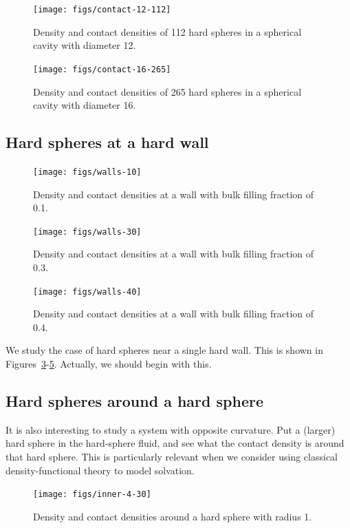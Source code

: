 \documentclass[letterpaper,twocolumn,amsmath,amssymb,prb]{revtex4-1}
\begin{document}
\begin{figure}
  \texttt{[image: figs/contact-12-112]}
  \caption{Density and contact densities of 112 hard spheres in a
    spherical cavity with diameter 12.  \sphereExplanation}
  \label{fig:sphere-12}
\end{figure}

\begin{figure}
  \texttt{[image: figs/contact-16-265]}
  \caption{Density and contact densities of 265 hard spheres in a
    spherical cavity with diameter 16. \sphereExplanation}
  \label{fig:sphere-16}
\end{figure}

\subsection{Hard spheres at a hard wall}

\begin{figure}
  \texttt{[image: figs/walls-10]}
  \caption{Density and contact densities at a wall with bulk filling
    fraction of 0.1.}
  \label{fig:walls-10}
\end{figure}

\begin{figure}
  \texttt{[image: figs/walls-30]}
  \caption{Density and contact densities at a wall with bulk filling
    fraction of 0.3.}
  \label{fig:walls-30}
\end{figure}

\begin{figure}
  \texttt{[image: figs/walls-40]}
  \caption{Density and contact densities at a wall with bulk filling
    fraction of 0.4.}
  \label{fig:walls-40}
\end{figure}

We study the case of hard spheres near a single hard wall.  This is
shown in Figures~\ref{fig:walls-10}-\ref{fig:walls-40}.  Actually, we
should begin with this.

\subsection{Hard spheres around a hard sphere}

It is also interesting to study a system with opposite curvature.  Put
a (larger) hard sphere in the hard-sphere fluid, and see what the
contact density is around that hard sphere.  This is particularly
relevant when we consider using classical density-functional theory to
model solvation.

\begin{figure}
  \texttt{[image: figs/inner-4-30]}
  \caption{Density and contact densities around a hard sphere with
    radius 1.}
  \label{fig:inner-4-30}
\end{figure}
\end{document}
